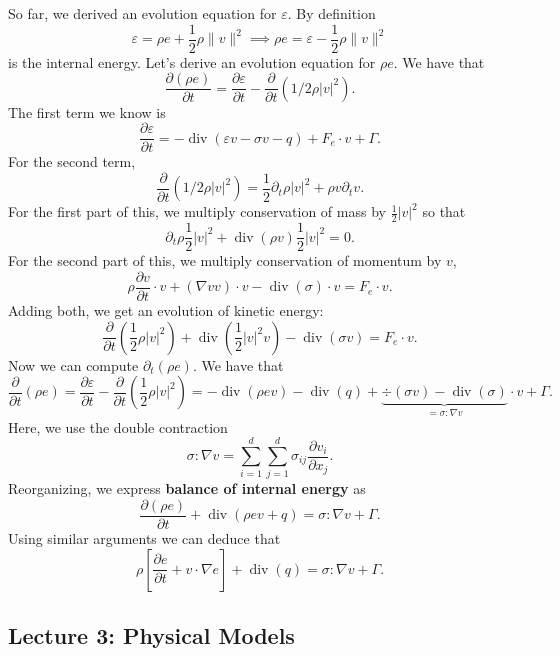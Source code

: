 \documentclass{article}
\theoremstyle{definition}
\theoremstyle{definition}
\begin{document}
So far, we derived an evolution equation for $\varepsilon$. By definition
$$\varepsilon=\rho e+\frac{1}{2}\rho\|v\|^2 \implies \rho e=\varepsilon-\frac{1}{2}\rho\|v\|^2$$
is the internal energy. Let's derive an evolution equation for $\rho e$. We have that
$$\frac{\partial (\rho e)}{\partial t}=\frac{\partial \varepsilon}{\partial t}-\frac{\partial}{\partial t}(1/2\rho|v|^2).$$
The first term we know is
$$\frac{\partial \varepsilon}{\partial t}=-\operatorname{div}(\varepsilon v-\sigma v-q)+F_e\cdot v+\Gamma.$$
For the second term,
$$\frac{\partial}{\partial t}(1/2\rho |v|^2)=\frac{1}{2}\partial_{t}\rho |v|^2+\rho v\partial_{t}v.$$
For the first part of this, we multiply conservation of mass by $\frac{1}{2}|v|^2$ so that
$$\partial_{t}\rho \frac{1}{2}|v|^2+\operatorname{div}(\rho v)\frac{1}{2}|v|^2=0.$$
For the second part of this, we multiply conservation of momentum by $v$,
$$\rho \frac{\partial v}{\partial t}\cdot v+(\nabla vv)\cdot v-\operatorname{div}(\sigma)\cdot v=F_e\cdot v.$$
Adding both, we get an evolution of kinetic energy:
$$\frac{\partial }{\partial t}\left(\frac{1}{2}\rho|v|^2\right)+\operatorname{div}\left(\frac{1}{2}|v|^2v\right)-\operatorname{div}(\sigma v)=F_e\cdot v.$$
Now we can compute $\partial_{t}(\rho e)$. We have that
$$\frac{\partial}{\partial t}(\rho e)=\frac{\partial \varepsilon}{\partial t}-\frac{\partial}{\partial t}\left(\frac{1}{2}\rho |v|^2\right)=-\operatorname{div}(\rho e v)-\operatorname{div}(q)+\underbrace{\div(\sigma v)-\operatorname{div}(\sigma)}_{=\sigma:\nabla v}\cdot v+\Gamma.$$
Here, we use the double contraction
$$\sigma:\nabla v=\sum_{i=1}^{d}\sum_{j=1}^{d}\sigma_{ij}\frac{\partial v_i}{\partial x_j}.$$
Reorganizing, we express \textbf{balance of internal energy} as
$$\frac{\partial (\rho e)}{\partial t}+\operatorname{div}(\rho ev+q)=\sigma:\nabla v+\Gamma.$$
Using similar arguments we can deduce that
$$\rho\left[\frac{\partial e}{\partial t}+v\cdot \nabla e\right]+\operatorname{div}(q)=\sigma:\nabla v+\Gamma.$$

\subsection{Lecture 3: Physical Models}
\end{document}
